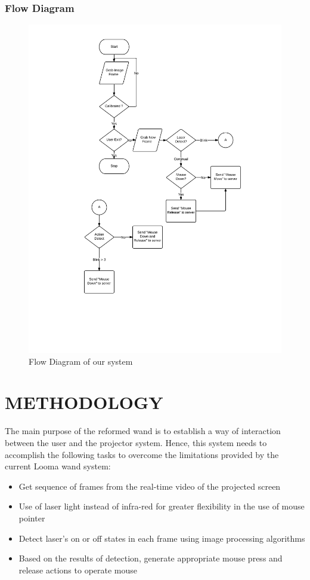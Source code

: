 \documentclass[12pt, a4paper]{article}
\begin{document}
\subsubsection{Flow Diagram}
\begin{figure}[htp]
\centering
\includegraphics[scale=0.15]{flow.png}
\caption{Flow Diagram of our system}
\label{ }
\end{figure}

\newpage
\section{METHODOLOGY}
The main purpose of the reformed wand is to establish a way of interaction between the user and the projector system. Hence, this system needs to accomplish the following tasks to overcome the limitations provided by the current Looma wand system:
\begin{itemize}
\item Get sequence of frames from the real-time video of the projected screen
\item Use of laser light instead of infra-red for greater flexibility in the use of mouse pointer
\item Detect laser’s on or off states in each frame using image processing algorithms
\item Based on the results of detection, generate appropriate mouse press and release actions to operate mouse
\end{itemize}
\end{document}
